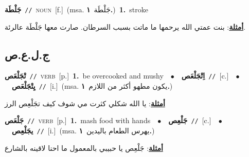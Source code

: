\documentclass[10pt,a4paper,twoside]{article} %
\begin{document}
\begin{multicols}{2}
{\setlength\topsep{0pt}\textbf{\foreignlanguage{arabic}{جَلْطَة}}\ {\color{gray}\texttt{//}\color{black}}\ \textsc{noun}\ [f.]\ \color{gray}(msa. \foreignlanguage{arabic}{جَلْطَة}~\foreignlanguage{arabic}{\textbf{١.}})\color{black}\ \textbf{1.}~stroke\  \begin{flushright}\color{gray}\foreignlanguage{arabic}{\textbf{\underline{\foreignlanguage{arabic}{أمثلة}}}: بنت عمتي الله يرحمها ما ماتت بسبب السرطان. صارت معها جَلْطَة عالرئة.}\end{flushright}\color{black}} \vspace{2mm}

\vspace{-3mm}
\subsection*{\color{blue}\foreignlanguage{arabic}{ج.ل.ع.ص}\color{blue}{}} 

{\setlength\topsep{0pt}\textbf{\foreignlanguage{arabic}{تْجَلْعَص}}\ {\color{gray}\texttt{//}\color{black}}\ \textsc{verb}\ [p.]\ \textbf{1.}~be overcooked and mushy\ \ $\bullet$\ \ \setlength\topsep{0pt}\textbf{\foreignlanguage{arabic}{اِتْجَلْعَص}}\ {\color{gray}\texttt{//}\color{black}}\ [c.]\ \ $\bullet$\ \ \setlength\topsep{0pt}\textbf{\foreignlanguage{arabic}{يِتْجَلْعَص}}\ {\color{gray}\texttt{//}\color{black}}\ [i.]\ \color{gray}(msa. \foreignlanguage{arabic}{يكون مطهو أكثر من اللازم}~\foreignlanguage{arabic}{\textbf{١.}})\color{black}\  \begin{flushright}\color{gray}\foreignlanguage{arabic}{\textbf{\underline{\foreignlanguage{arabic}{أمثلة}}}: يا الله شكلي كثرت مي شوف كيف تجَلْعِص الرز}\end{flushright}\color{black}} \vspace{2mm}

{\setlength\topsep{0pt}\textbf{\foreignlanguage{arabic}{جَلْعَص}}\ {\color{gray}\texttt{//}\color{black}}\ \textsc{verb}\ [p.]\ \textbf{1.}~mash food with hands\ \ $\bullet$\ \ \setlength\topsep{0pt}\textbf{\foreignlanguage{arabic}{جَلْعِص}}\ {\color{gray}\texttt{//}\color{black}}\ [c.]\ \ $\bullet$\ \ \setlength\topsep{0pt}\textbf{\foreignlanguage{arabic}{يجَلْعِص}}\ {\color{gray}\texttt{//}\color{black}}\ [i.]\ \color{gray}(msa. \foreignlanguage{arabic}{يهرس الطعام باليدين}~\foreignlanguage{arabic}{\textbf{١.}})\color{black}\  \begin{flushright}\color{gray}\foreignlanguage{arabic}{\textbf{\underline{\foreignlanguage{arabic}{أمثلة}}}: جَلْعِص يا حبيبي بالمعمول ما احنا لاقينه بالشارع}\end{flushright}\color{black}} \vspace{2mm}


\end{multicols}
\end{document}
